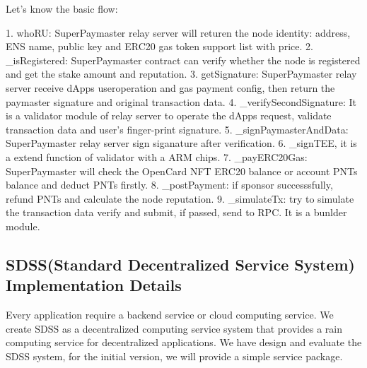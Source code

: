 \documentclass[preprint,12pt]{elsarticle}
\begin{document}
Let's know the basic flow:

1. whoRU: SuperPaymaster relay server will returen the node identity: address, ENS name, public key and ERC20 gas token support list with price.
2. \_isRegistered: SuperPaymaster contract can verify whether the node is registered and get the stake amount and reputation.
3. getSignature: SuperPaymaster relay server receive dApps useroperation and gas payment config, then return the paymaster signature and original transaction data.
4. \_verifySecondSignature: It is a validator module of relay server to operate the dApps request, validate transaction data and user's finger-print signature.
5. \_signPaymasterAndData: SuperPaymaster relay server sign siganature after verification.
6. \_signTEE, it is a extend function of validator with a ARM chips.
7. \_payERC20Gas: SuperPaymaster will check the OpenCard NFT ERC20 balance or account PNTs balance and deduct PNTs firstly.
8. \_postPayment: if sponsor successsfully, refund PNTs and calculate the node reputation.
9. \_simulateTx: try to simulate the transaction data verify and submit, if passed, send to RPC. It is a bunlder module.

\subsection{SDSS(Standard Decentralized Service System) Implementation Details}
\label{subsec:sdss-implementation}

Every application require a backend service or cloud computing service. We create SDSS as a decentralized computing service system that provides a rain computing service for decentralized applications. We have design and evaluate the SDSS system, for the initial version, we will provide a simple service package.
\end{document}
